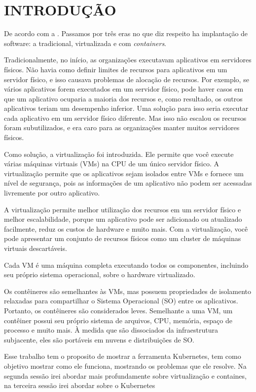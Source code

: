 \chapter{INTRODUÇÃO}
\label{chap:introducao}

De acordo com a . Passamos por três eras no que diz respeito ha implantação de software: a tradicional, virtualizada e com \textit{containers}.

Tradicionalmente, no início, as organizações executavam aplicativos em servidores físicos. Não havia como definir limites de recursos para aplicativos em um servidor físico, e isso causava problemas de alocação de recursos. Por exemplo, se vários aplicativos forem executados em um servidor físico, pode haver casos em que um aplicativo ocuparia a maioria dos recursos e, como resultado, os outros aplicativos teriam um desempenho inferior. Uma solução para isso seria executar cada aplicativo em um servidor físico diferente. Mas isso não escalou os recursos foram subutilizados, e era caro para as organizações manter muitos servidores físicos.

Como solução, a virtualização foi introduzida. Ele permite que você execute várias máquinas virtuais (VMs) na CPU de um único servidor físico. A virtualização permite que os aplicativos sejam isolados entre VMs e fornece um nível de segurança, pois as informações de um aplicativo não podem ser acessadas livremente por outro aplicativo.

A virtualização permite melhor utilização dos recursos em um servidor físico e melhor escalabilidade, porque um aplicativo pode ser adicionado ou atualizado facilmente, reduz os custos de hardware e muito mais. Com a virtualização, você pode apresentar um conjunto de recursos físicos como um cluster de máquinas virtuais descartáveis.

Cada VM é uma máquina completa executando todos os componentes, incluindo seu próprio sistema operacional, sobre o hardware virtualizado.

Os contêineres são semelhantes às VMs, mas possuem propriedades de isolamento relaxadas para compartilhar o Sistema Operacional (SO) entre os aplicativos. Portanto, os contêineres são considerados leves. Semelhante a uma VM, um contêiner possui seu próprio sistema de arquivos, CPU, memória, espaço de processo e muito mais. À medida que são dissociados da infraestrutura subjacente, eles são portáveis em nuvens e distribuições de SO.

Esse trabalho tem o proposito de mostrar a ferramenta Kubernetes, tem como objetivo mostrar como ele funciona, mostrando os problemas que ele resolve. Na segunda sessão irei abordar mais profundamente sobre virtualização e containes, na terceira sessão irei abordar sobre o 
Kubernetes
